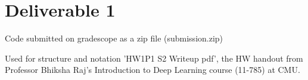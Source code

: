 
\section{Deliverable 1}

\begin{solve}    
Code submitted on gradescope as a zip file (submission.zip)

Used for structure and notation
{'HW1P1 S2 Writeup pdf'}, the HW handout from Professor Bhiksha Raj's Introduction to Deep Learning course (11-785) at CMU.

\end{solve}